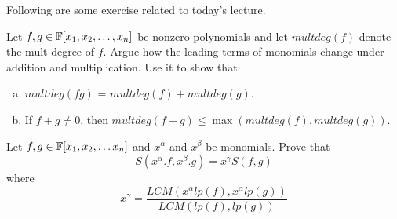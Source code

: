 Following are some exercise related to today's lecture.
\begin{exercise}
Let $f,g \in {\mathbb{F}}[x_1, x_2, \ldots, x_n]$ be nonzero polynomials and let $multdeg(f)$ denote the mult-degree of $f$. Argue how the leading terms of monomials change under addition and multiplication. Use it to show that:
\begin{enumerate}[(a)]
\item $multdeg(fg)$ = $multdeg(f)+multdeg(g)$.
\item If $f+g \ne 0$, then $multdeg(f+g) \le \max(multdeg(f),multdeg(g))$.
\end{enumerate}
\end{exercise}


\begin{exercise}
Let $f, g \in {\mathbb{F}}[x_1, x_2, \ldots x_n]$ and $x^\alpha$ and $x^\beta$ be monomials. Prove that 
\[ S(x^\alpha.f,x^\beta.g) = x^\gamma S(f,g) \]
where
\[ x^\gamma = \frac{LCM(x^\alpha lp(f),x^\alpha lp(g))}{LCM(lp(f),lp(g))} \]
\end{exercise}


